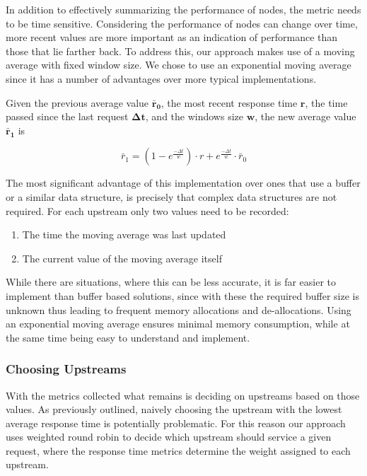 \documentclass[draft,final]{vutinfth} %
\begin{document}
In addition to effectively summarizing the performance of nodes, the metric needs to be time sensitive. Considering the performance of nodes can change over time, more recent values are more important as an indication of performance than those that lie farther back.
To address this, our approach makes use of a moving average with fixed window size.
We chose to use an exponential moving average since it has a number of advantages over more typical implementations.

Given the previous average value $\mathbf{\bar{r}_{0}}$, the most recent response time $\mathbf{r}$, the time passed since the last request $\mathbf{\Delta t}$, and the windows size $\mathbf{w}$, the new average value $\mathbf{\bar{r}_{1}}$ is

\[\bar{r}_{1} = (1 - e^{\frac{-\Delta t}{w}}) \cdot r + e^{\frac{-\Delta t}{w}} \cdot \bar{r}_{0}\]

The most significant advantage of this implementation over ones that use a buffer or a similar data structure, is precisely that complex data structures are not required. For each upstream only two values need to be recorded:
\begin{enumerate}
    \item The time the moving average was last updated
    \item The current value of the moving average itself
\end{enumerate}
While there are situations, where this can be less accurate, it is far easier to implement than buffer based solutions, since with these the required buffer size is unknown thus leading to frequent memory allocations and de-allocations.
Using an exponential moving average ensures minimal memory consumption, while at the same time being easy to understand and implement.

\subsubsection{Choosing Upstreams}
With the metrics collected what remains is deciding on upstreams based on those values. As previously outlined, naively choosing the upstream with the lowest average response time is potentially problematic.
For this reason our approach uses weighted round robin to decide which upstream should service a given request, where the response time metrics determine the weight assigned to each upstream.
\end{document}
